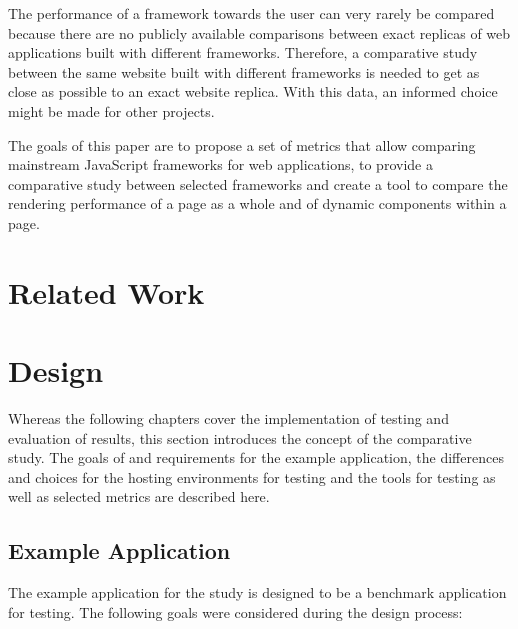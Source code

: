 \documentclass[a4paper, 10pt]{article}
\begin{document}
The performance of a framework towards the user can very rarely be compared because there are no publicly available comparisons between exact replicas of web applications built with different frameworks.
Therefore, a comparative study between the same website built with different frameworks is needed to get as close as possible to an exact website replica.
With this data, an informed choice might be made for other projects.

The goals of this paper are to propose a set of metrics that allow comparing mainstream JavaScript frameworks for web applications, to provide a comparative study between selected frameworks and create a tool to compare the rendering performance of a page as a whole and of dynamic components within a page.

\section{Related Work}\label{sec:relatedwork}

\section{Design}\label{sec:design}

Whereas the following chapters cover the implementation of testing and evaluation of results, this section introduces the concept of the comparative study.
The goals of and requirements for the example application, the differences and choices for the hosting environments for testing and the tools for testing as well as selected metrics are described here.

\subsection{Example Application}\label{subsec:exampleapplication}
%
% 

The example application for the study is designed to be a benchmark application for testing.
The following goals were considered during the design process:
\end{document}

